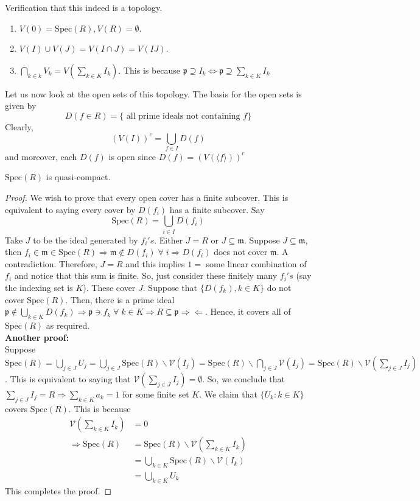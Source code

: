 \documentclass[oneside, 12pt, ]{scrbook}
\newcommand{\V}{\mathcal{V}}
\newcommand{\spec}{\mathrm{Spec}}
\newcommand{\pr}{\mathfrak{p}}
\newcommand{\m}{\mathfrak{m}}
\theoremstyle{theorem}
\begin{document}
Verification that this indeed is a topology. 
\begin{enumerate}
\item $V(0) = \mathrm{Spec}(R), V(R) = \emptyset$.
\item $V(I) \cup V(J) = V(I\cap J) = V(IJ)$.
\item $\bigcap_{k \in k} V_{k} = V(\sum_{k \in K} I_{k})$. This is because $\mathfrak{p} \supseteq I_{k} \Leftrightarrow \mathfrak{p} \supseteq \sum_{k \in K}I_{k}$
\end{enumerate}

Let us now look at the open sets of this topology. The basis for the open sets is given by $$D(f \in R) = \{ \text{ all prime ideals not containing } f\}$$
Clearly, $$(V(I))^c = \bigcup_{f \in I} D(f)$$ and moreover, each $D(f)$ is open since $D(f) = (V(\langle f \rangle))^c$

\begin{theorem}
$\mathrm{Spec}(R)$ is quasi-compact.
\end{theorem}

\begin{proof}
We wish to prove that every open cover has a finite subcover. This is equivalent to saying every cover by $D(f_{i})$ has a finite subcover. Say $$\spec(R) = \bigcup_{i \in I} D(f_{i})$$ Take $J$ to be the ideal generated by $f_{i}'s$. Either $J = R$ or $J \subseteq \mathfrak{m}$. Suppose $J \subseteq \m$, then $f_{i} \in \m \in \spec(R) \Rightarrow \m \not \in D(f_{i}) \; \forall \; i \Rightarrow D(f_{i})$ does not cover $\m$. A contradiction. Therefore, $J=R$ and this implies $1 =$ some linear combination of $f_{i}$ and notice that this sum is finite. So, just consider these finitely many $f_{i}'s$ (say the indexing set is $K$). These cover $J$. Suppose that $\{ D(f_{k}), k \in K\}$ do not cover $\spec(R)$. Then, there is a prime ideal $\pr \not \in \bigcup_{k\in K}D(f_{k}) \Rightarrow \pr \ni f_{k} \; \forall\; k \in K \Rightarrow R \subseteq \pr \Rightarrow \Leftarrow$. Hence, it covers all of $\spec(R)$ as required. \\

\textbf{Another proof:}\\
Suppose $\spec(R) = \bigcup_{j \in J} U_{j} = \bigcup_{j \in J} \spec(R) \backslash \V(I_{j}) = \spec(R) \backslash \bigcap_{j \in J} \V(I_{j}) =\spec(R) \backslash \V(\sum_{j \in J} I_{j})$. This is equivalent to saying that $\V(\sum_{j \in J} I_{j}) = \emptyset$. So, we conclude that $\sum_{j \in J}I_{j} = R \Rightarrow \sum_{k \in K}a_{k} = 1$ for some finite set $K$. We claim that $\{U_{k}: k \in K\}$ covers $\spec(R)$. This is because 
\begin{align*}
\V(\sum_{k\in K} I_{k}) &= 0 \\
\Rightarrow \spec(R) &= \spec(R) \backslash \V(\sum_{k\in K} I_{k})  \\
&= \bigcup_{k \in K} \spec(R) \backslash \V(I_{k}) \\
&= \bigcup_{k \in K} U_{k}
\end{align*}
This completes the proof. 
\end{proof}
\end{document}
